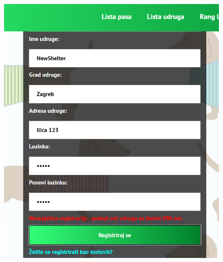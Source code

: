 			 \begin{figure}[H]
			 	\includegraphics[scale=0.70]{slike/OIBError.PNG}
			 	\centering
			 \end{figure}
